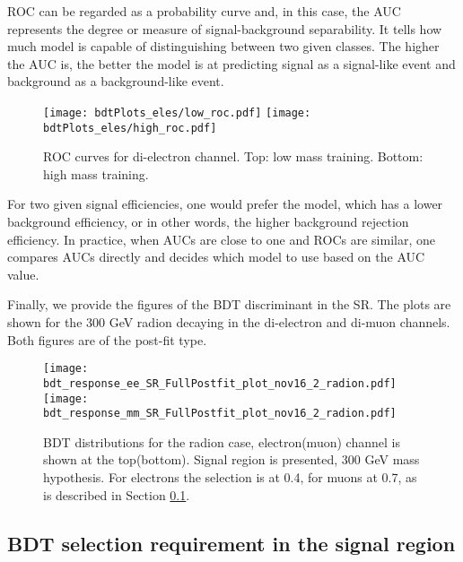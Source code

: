 \begin{small}
ROC can be regarded as a probability curve and, in this case, the AUC represents the degree or measure of signal-background separability. It tells how much model is capable of distinguishing between two given classes. The higher the AUC is, the better the model is at predicting signal as a signal-like event and background as a background-like event.

\begin{figure}[H]
  \begin{center}
   \texttt{[image: bdtPlots\_eles/low\_roc.pdf]}
   \texttt{[image: bdtPlots\_eles/high\_roc.pdf]}
    \caption[ROC curves for di-electron channel.]{ ROC curves for di-electron channel. Top: low mass training. Bottom: high mass training. }
    \label{fig:ele_ROCs}
  \end{center}
\end{figure}

For two given signal efficiencies, one would prefer the model, which has a lower background efficiency, or in other words, the higher background rejection efficiency. In practice, when AUCs are close to one and ROCs are similar, one compares AUCs directly and decides which model to use based on the AUC value. 

Finally, we provide the figures of the BDT discriminant in the SR. The plots are shown for the 300 GeV radion decaying in the di-electron and di-muon channels. Both figures are of the post-fit type.

\begin{figure}[H]
  \begin{center}
   \texttt{[image: bdt\_response\_ee\_SR\_FullPostfit\_plot\_nov16\_2\_radion.pdf]}\\
   \texttt{[image: bdt\_response\_mm\_SR\_FullPostfit\_plot\_nov16\_2\_radion.pdf]}\\
    \caption[BDT distributions for the radion case.]{ BDT distributions for the radion case, electron(muon) channel is shown at the top(bottom). Signal region is presented, 300 GeV mass hypothesis. For electrons the selection is at 0.4, for muons at 0.7, as is described in Section \ref{BDT_selection_in_SR}.}
    \label{fig:BDTs}
  \end{center}
\end{figure}

\subsection{BDT selection requirement in the signal region}
\label{BDT_selection_in_SR}


\end{small}
